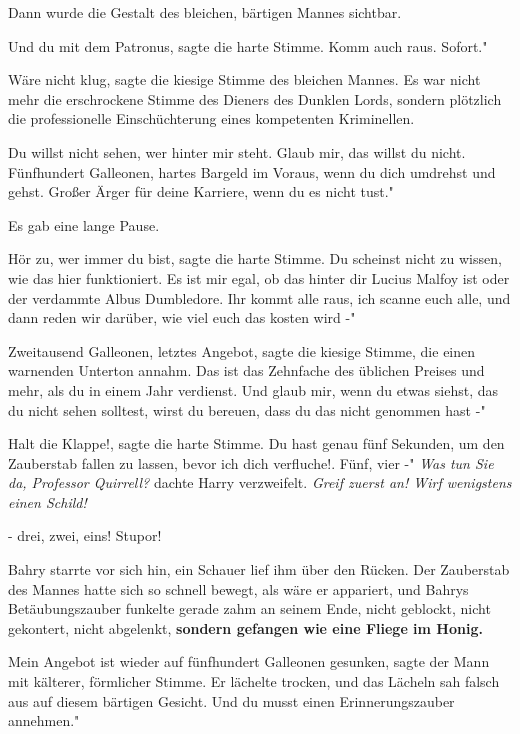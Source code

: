 Dann wurde die Gestalt des bleichen, bärtigen Mannes sichtbar.

\glqq{}Und du mit dem Patronus\grqq{}, sagte die harte Stimme. \glqq{}Komm auch
raus. Sofort."

\glqq{}Wäre nicht klug\grqq{}, sagte die kiesige Stimme des bleichen Mannes. Es
war nicht mehr die erschrockene Stimme des Dieners des Dunklen Lords, sondern
plötzlich die professionelle Einschüchterung eines kompetenten Kriminellen.

\glqq{}Du willst nicht sehen, wer hinter mir steht. Glaub mir, das willst du
nicht. Fünfhundert Galleonen, hartes Bargeld im Voraus, wenn du dich umdrehst
und gehst. Großer Ärger für deine Karriere, wenn du es nicht tust."

Es gab eine lange Pause.

\glqq{}Hör zu, wer immer du bist\grqq{}, sagte die harte Stimme. \glqq{}Du
scheinst nicht zu wissen, wie das hier funktioniert. Es ist mir egal, ob das
hinter dir Lucius Malfoy ist oder der verdammte Albus Dumbledore. Ihr kommt alle
raus, ich scanne euch alle, und dann reden wir darüber, wie viel euch das kosten
wird -"

\glqq{}Zweitausend Galleonen, letztes Angebot\grqq{}, sagte die kiesige Stimme,
die einen warnenden Unterton annahm. \glqq{}Das ist das Zehnfache des üblichen
Preises und mehr, als du in einem Jahr verdienst. Und glaub mir, wenn du etwas
siehst, das du nicht sehen solltest, wirst du bereuen, dass du das nicht
genommen hast -"

\glqq{}Halt die Klappe!\grqq{}, sagte die harte Stimme. \glqq{}Du hast genau fünf
Sekunden, um den Zauberstab fallen zu lassen, bevor ich dich verfluche!. Fünf,
vier -" \emph{ Was tun Sie da, Professor Quirrell?} dachte Harry verzweifelt.
\emph{Greif zuerst an! Wirf wenigstens einen Schild!}

\glqq{}- drei, zwei, eins! Stupor!\grqq{}

Bahry starrte vor sich hin, ein Schauer lief ihm über den Rücken. Der Zauberstab
des Mannes hatte sich so schnell bewegt, als wäre er appariert, und Bahrys
Betäubungszauber funkelte gerade zahm an seinem Ende, nicht geblockt, nicht
gekontert, nicht abgelenkt, \textbf{sondern gefangen wie eine Fliege im Honig.}

\glqq{}Mein Angebot ist wieder auf fünfhundert Galleonen gesunken\grqq{}, sagte
der Mann mit kälterer, förmlicher Stimme. Er lächelte trocken, und das Lächeln
sah falsch aus auf diesem bärtigen Gesicht. \glqq{}Und du musst einen
Erinnerungszauber annehmen."


